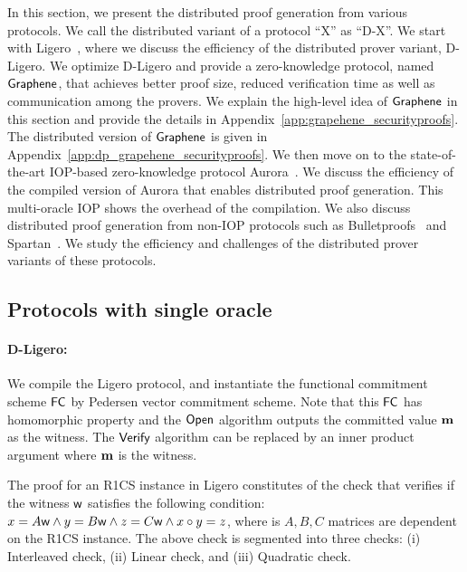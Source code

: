 In this section, we present the distributed proof generation from various protocols. We call the distributed variant of a protocol ``X'' as ``D-X''. We start with Ligero~\cite{ligero}, where we discuss the efficiency of the distributed prover variant, D-Ligero. We optimize D-Ligero and provide a zero-knowledge protocol, named $\textsf{Graphene}$, that achieves better proof size, reduced verification time as well as communication among the provers. We explain the high-level idea of $\textsf{Graphene}$ in this section and provide the details in Appendix~\ref{app:grapehene_securityproofs}. The distributed version of $\textsf{Graphene}$ is given in Appendix~\ref{app:dp_grapehene_securityproofs}.
We then move on to the state-of-the-art IOP-based zero-knowledge protocol Aurora~\cite{aurora}. We discuss the efficiency of the compiled version of Aurora that enables distributed proof generation. This multi-oracle IOP shows the overhead of the compilation. 
We also discuss distributed proof generation from non-IOP protocols such as Bulletproofs~\cite{bulletproofs} and Spartan~\cite{spartan}. We study the efficiency and challenges of the distributed prover variants of these protocols. 


\subsection{Protocols with single oracle}
\paragraph*{D-Ligero:}
We compile the Ligero protocol, and instantiate the functional commitment scheme $\mathsf{FC}$ by Pedersen vector commitment scheme. Note that this $\mathsf{FC}$ has homomorphic property and the $\mathsf{Open}$ algorithm outputs the committed value ${\bf m}$ as the witness. The $\mathsf{Verify}$ algorithm can be replaced by an inner product argument where ${\bf m}$ is the witness.

The proof for an R1CS instance in Ligero constitutes of the check that verifies if the witness $\mathsf{w}$ satisfies the following condition: $x = A \mathsf{w} \land y = B \mathsf{w} \land z = C \mathsf{w} \land x \circ y = z$, where is $A, B, C$ matrices are dependent on the R1CS instance. The above check is segmented into three checks: (i) Interleaved check, (ii) Linear check, and (iii) Quadratic check. 

